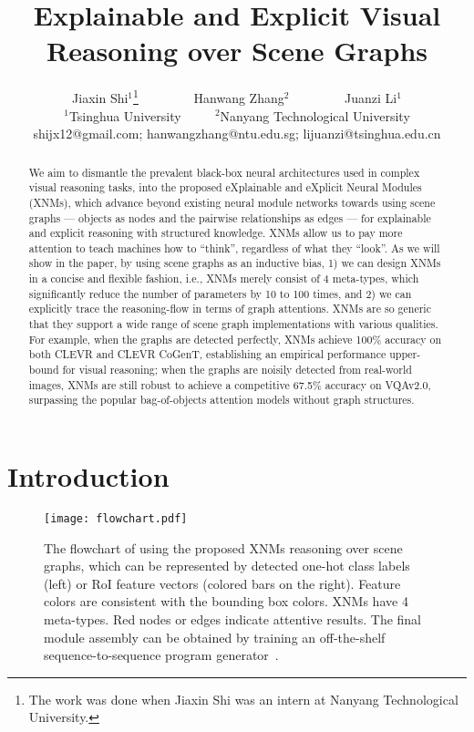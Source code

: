 \documentclass[10pt,twocolumn,letterpaper]{article}
\begin{document}
\title{Explainable and Explicit Visual Reasoning over Scene Graphs}

\author{Jiaxin Shi$^{1}$\protect \thanks{The work was done when Jiaxin Shi was an intern at Nanyang Technological University.} ~~~~~~~~Hanwang Zhang$^{2}$   ~~~~~~~~Juanzi Li$^1$\\
$^1$Tsinghua University ~~~~
$^2$Nanyang Technological University \\
shijx12@gmail.com; hanwangzhang@ntu.edu.sg; lijuanzi@tsinghua.edu.cn
}

\maketitle


\begin{abstract}
We aim to dismantle the prevalent black-box neural architectures used in complex visual reasoning tasks, into the proposed eXplainable and eXplicit Neural Modules (XNMs), which advance beyond existing neural module networks towards using scene graphs --- objects as nodes and the pairwise relationships as edges --- for explainable and explicit reasoning with structured knowledge. XNMs allow us to pay more attention to teach machines how to ``think'', regardless of what they ``look''. As we will show in the paper, by using scene graphs as an inductive bias, 1) we can design XNMs in a concise and flexible fashion, i.e., XNMs merely consist of 4 meta-types, which significantly reduce the number of parameters by 10 to 100 times, and 2) we can explicitly trace the reasoning-flow in terms of graph attentions. XNMs are so generic that they support a wide range of scene graph implementations with various qualities. For example, when the graphs are detected perfectly, XNMs achieve 100\% accuracy on both CLEVR and CLEVR CoGenT, establishing an empirical performance upper-bound for visual reasoning; when the graphs are noisily detected from real-world images, XNMs are still robust to achieve a competitive 67.5\% accuracy on VQAv2.0, surpassing the popular bag-of-objects attention models without graph structures. 
\end{abstract}



\vspace{-0.4cm}
\section{Introduction}
\begin{figure}[t]
\texttt{[image: flowchart.pdf]}
\caption{The flowchart of using the proposed XNMs reasoning over scene graphs, which can be represented by detected one-hot class labels (left) or RoI feature vectors (colored bars on the right). Feature colors are consistent with the bounding box colors. XNMs have 4 meta-types. Red nodes or edges indicate attentive results. The final module assembly can be obtained by training an off-the-shelf sequence-to-sequence program generator~\cite{johnson2017inferring}.}
\label{fig:1}
\vspace{-0.5cm}
\end{figure}
\end{document}
